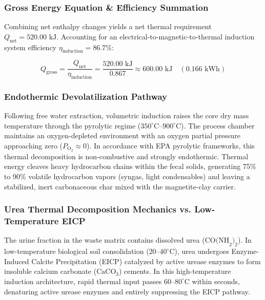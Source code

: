 \documentclass[10pt,twocolumn,a4paper]{article}
\begin{document}
\subsubsection*{Gross Energy Equation \& Efficiency Summation}

Combining net enthalpy changes yields a net thermal requirement $Q_{\text{net}} = 520.00\text{ kJ}$. Accounting for an electrical-to-magnetic-to-thermal induction system efficiency $\eta_{\text{induction}} = 86.7\%$:

\begin{equation}
Q_{\text{gross}} = \frac{Q_{\text{net}}}{\eta_{\text{induction}}} = \frac{520.00\text{ kJ}}{0.867} \approx 600.00\text{ kJ} \quad (0.166\text{ kWh})
\end{equation}

\subsubsection*{Endothermic Devolatilization Pathway}

Following free water extraction, volumetric induction raises the core dry mass temperature through the pyrolytic regime ($350^\circ\text{C}\text{--}900^\circ\text{C}$). The process chamber maintains an oxygen-depleted environment with an oxygen partial pressure approaching zero ($P_{\text{O}_2} \approx 0$). In accordance with EPA pyrolytic frameworks, this thermal decomposition is non-combustive and strongly endothermic. Thermal energy cleaves heavy hydrocarbon chains within the fecal solids, generating 75\% to 90\% volatile hydrocarbon vapors (syngas, light condensables) and leaving a stabilized, inert carbonaceous char mixed with the magnetite-clay carrier.

\subsubsection*{Urea Thermal Decomposition Mechanics vs. Low-Temperature EICP}

The urine fraction in the waste matrix contains dissolved urea ($\text{CO(NH}_2)_2$). In low-temperature biological soil consolidation ($20\text{--}40^\circ\text{C}$), urea undergoes Enzyme-Induced Calcite Precipitation (EICP) catalyzed by active urease enzymes to form insoluble calcium carbonate ($\text{CaCO}_3$) cements. In this high-temperature induction architecture, rapid thermal input passes $60\text{--}80^\circ\text{C}$ within seconds, denaturing active urease enzymes and entirely suppressing the EICP pathway.
\end{document}
